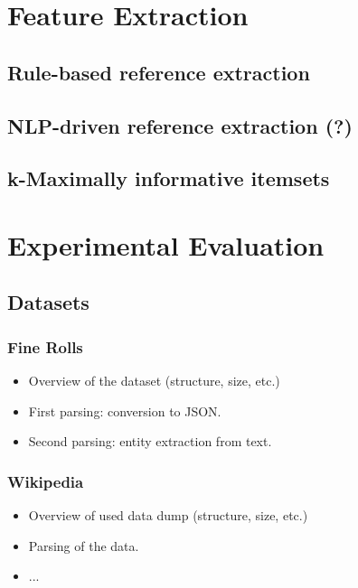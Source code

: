 \documentclass[paper=a4, fontsize=11pt]{scrartcl}
\begin{document}
\section{Feature Extraction}

\subsection{Rule-based reference extraction}

\subsection{NLP-driven reference extraction (?)}

\subsection{k-Maximally informative itemsets}




\section{Experimental Evaluation}

\subsection{Datasets}

\subsubsection{Fine Rolls}

\begin{itemize}
	\item Overview of the dataset (structure, size, etc.)
	\item First parsing: conversion to JSON.
	\item Second parsing: entity extraction from text.
\end{itemize}


\subsubsection{Wikipedia}
	
\begin{itemize}
	\item Overview of used data dump (structure, size, etc.)
	\item Parsing of the data.
	\item ...
\end{itemize}
\end{document}
